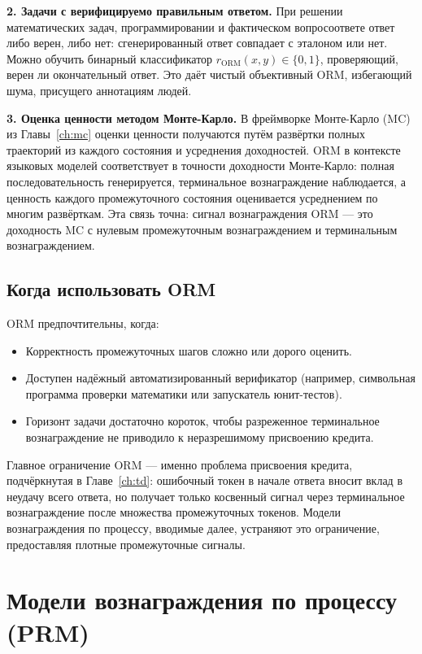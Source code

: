 \textbf{2. Задачи с верифицируемо правильным ответом.} При решении математических задач, программировании и фактическом вопросоответе ответ либо верен, либо нет: сгенерированный ответ совпадает с эталоном или нет. Можно обучить бинарный классификатор $r_{\mathrm{ORM}}(x, y) \in \{0, 1\}$, проверяющий, верен ли окончательный ответ. Это даёт чистый объективный ORM, избегающий шума, присущего аннотациям людей.

\textbf{3. Оценка ценности методом Монте-Карло.} В фреймворке Монте-Карло (MC) из Главы~\ref{ch:mc} оценки ценности получаются путём развёртки полных траекторий из каждого состояния и усреднения доходностей. ORM в контексте языковых моделей соответствует в точности доходности Монте-Карло: полная последовательность генерируется, терминальное вознаграждение наблюдается, а ценность каждого промежуточного состояния оценивается усреднением по многим развёрткам. Эта связь точна: сигнал вознаграждения ORM --- это доходность MC с нулевым промежуточным вознаграждением и терминальным вознаграждением.

\subsection{Когда использовать ORM}

ORM предпочтительны, когда:
\begin{itemize}[leftmargin=*]
  \item Корректность промежуточных шагов сложно или дорого оценить.
  \item Доступен надёжный автоматизированный верификатор (например, символьная программа проверки математики или запускатель юнит-тестов).
  \item Горизонт задачи достаточно короток, чтобы разреженное терминальное вознаграждение не приводило к неразрешимому присвоению кредита.
\end{itemize}

Главное ограничение ORM --- именно проблема присвоения кредита, подчёркнутая в Главе~\ref{ch:td}: ошибочный токен в начале ответа вносит вклад в неудачу всего ответа, но получает только косвенный сигнал через терминальное вознаграждение после множества промежуточных токенов. Модели вознаграждения по процессу, вводимые далее, устраняют это ограничение, предоставляя плотные промежуточные сигналы.

\section{Модели вознаграждения по процессу (PRM)}
\label{sec:prm}

